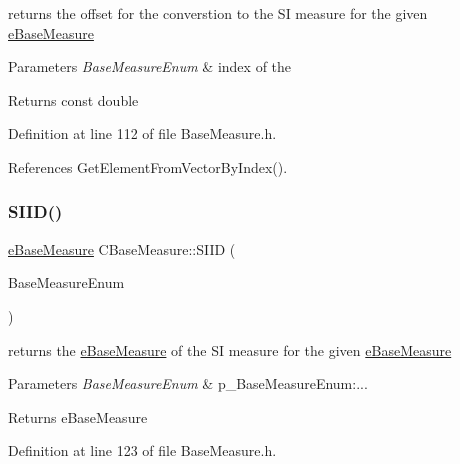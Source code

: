 returns the offset for the converstion to the SI measure for the given \hyperlink{BaseMeasure_8h_ac90e5164ccf1f0d648fba7e94b229a11}{e\+Base\+Measure} 


\begin{DoxyParams}{Parameters}
{\em Base\+Measure\+Enum} & index of the \\
\hline
\end{DoxyParams}
\begin{DoxyReturn}{Returns}
const double 
\end{DoxyReturn}


Definition at line 112 of file Base\+Measure.\+h.



References Get\+Element\+From\+Vector\+By\+Index().

\mbox{\label{classCBaseMeasure_a4a2040454722a288e24babbacef30d01}} 
\subsubsection{\texorpdfstring{S\+I\+I\+D()}{SIID()}}
{\footnotesize\ttfamily \hyperlink{BaseMeasure_8h_ac90e5164ccf1f0d648fba7e94b229a11}{e\+Base\+Measure} C\+Base\+Measure\+::\+S\+I\+ID (\begin{DoxyParamCaption}\item[{const \hyperlink{BaseMeasure_8h_ac90e5164ccf1f0d648fba7e94b229a11}{e\+Base\+Measure}}]{Base\+Measure\+Enum }\end{DoxyParamCaption})\hspace{0.3cm}{\ttfamily [inline]}}



returns the \hyperlink{BaseMeasure_8h_ac90e5164ccf1f0d648fba7e94b229a11}{e\+Base\+Measure} of the SI measure for the given \hyperlink{BaseMeasure_8h_ac90e5164ccf1f0d648fba7e94b229a11}{e\+Base\+Measure} 


\begin{DoxyParams}{Parameters}
{\em Base\+Measure\+Enum} & p\+\_\+\+Base\+Measure\+Enum\+:... \\
\hline
\end{DoxyParams}
\begin{DoxyReturn}{Returns}
e\+Base\+Measure 
\end{DoxyReturn}


Definition at line 123 of file Base\+Measure.\+h.



